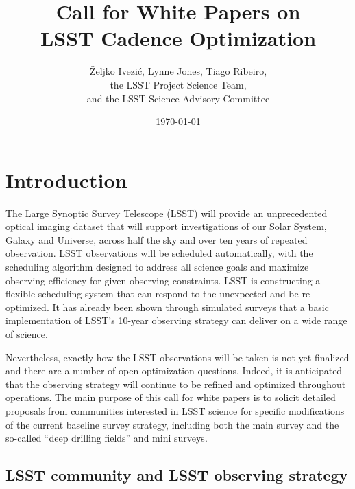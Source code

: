\documentclass[DM,lsstdraft,toc,usenatbib]{lsstdoc}
\title[Call for LSST Cadence White Papers]{Call for White Papers on \\ LSST Cadence Optimization}
\author{\v{Z}eljko Ivezi\'{c}, Lynne Jones, Tiago Ribeiro, \\
                 the LSST Project Science Team, \\
                 and  the LSST Science Advisory Committee}
\date{\today}
\begin{document}
\maketitle


\section{Introduction} 

The Large Synoptic Survey Telescope (LSST) will provide an unprecedented optical 
imaging dataset that will support investigations of our Solar System, Galaxy and Universe, 
across half the sky and over ten years of repeated observation. LSST observations will be
scheduled automatically, with the scheduling algorithm designed to address all science goals 
and maximize observing efficiency for given observing constraints. LSST is constructing a 
flexible scheduling system that can respond to the unexpected and be re-optimized. 
It has already been shown through simulated surveys that a basic implementation of LSST's 
10-year observing strategy can deliver on a wide range of science. 

Nevertheless, exactly how the LSST observations will be taken is not yet finalized and there
are a number of open optimization questions. Indeed, it is anticipated that the observing strategy 
will continue to be refined and optimized throughout operations. The main purpose of this 
call for white papers is to solicit detailed proposals from communities interested in LSST science
for specific modifications of the current baseline survey strategy, including both the main survey and 
the so-called ``deep drilling fields'' and mini surveys.


\subsection{LSST community and LSST observing strategy}
\end{document}
